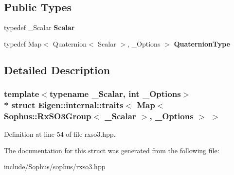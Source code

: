 \subsection*{Public Types}
\begin{DoxyCompactItemize}
\item 
typedef \+\_\+\+Scalar {\bfseries Scalar}\hypertarget{struct_eigen_1_1internal_1_1traits_3_01_map_3_01_sophus_1_1_rx_s_o3_group_3_01___scalar_01_4_00_01___options_01_4_01_4_a154ccaa06c68bd744ad4b625d3faa791}{}\label{struct_eigen_1_1internal_1_1traits_3_01_map_3_01_sophus_1_1_rx_s_o3_group_3_01___scalar_01_4_00_01___options_01_4_01_4_a154ccaa06c68bd744ad4b625d3faa791}

\item 
typedef Map$<$ Quaternion$<$ Scalar $>$, \+\_\+\+Options $>$ {\bfseries Quaternion\+Type}\hypertarget{struct_eigen_1_1internal_1_1traits_3_01_map_3_01_sophus_1_1_rx_s_o3_group_3_01___scalar_01_4_00_01___options_01_4_01_4_a5509a89c29e9b459ad066ea17f2ef931}{}\label{struct_eigen_1_1internal_1_1traits_3_01_map_3_01_sophus_1_1_rx_s_o3_group_3_01___scalar_01_4_00_01___options_01_4_01_4_a5509a89c29e9b459ad066ea17f2ef931}

\end{DoxyCompactItemize}


\subsection{Detailed Description}
\subsubsection*{template$<$typename \+\_\+\+Scalar, int \+\_\+\+Options$>$\\*
struct Eigen\+::internal\+::traits$<$ Map$<$ Sophus\+::\+Rx\+S\+O3\+Group$<$ \+\_\+\+Scalar $>$, \+\_\+\+Options $>$ $>$}



Definition at line 54 of file rxso3.\+hpp.



The documentation for this struct was generated from the following file\+:\begin{DoxyCompactItemize}
\item 
include/\+Sophus/sophus/rxso3.\+hpp\end{DoxyCompactItemize}
